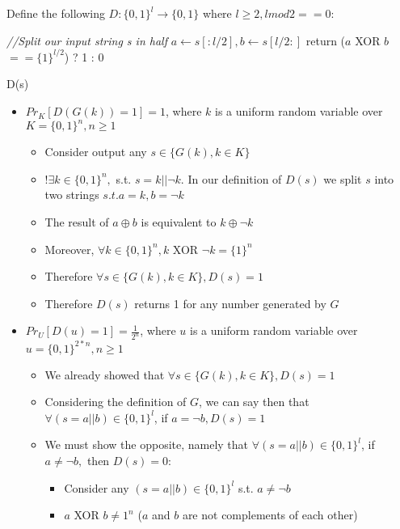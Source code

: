 \documentclass[]{article}
\begin{document}
\section{}
Define the following $D: \{0, 1\}^l \rightarrow \{0,1\}$ where $l \geq 2, l mod 2 == 0$:
\\
\begin{algorithm}[H]
\SetAlgoLined
	\emph{//Split our input string s in half}\;
	$a \leftarrow s[:l/2], b \leftarrow s[l/2:]$\;
	return ($a$ XOR $b$ $== \{1\}^{l/2}$) ? 1 : 0\;
	\caption{D(s)}
\end{algorithm}

\begin{itemize}
	\item $Pr_K[D(G(k)) = 1] = 1$, where $k$ is a uniform random variable over $K = \{0, 1\}^n, n \geq 1$
	\begin{itemize}
		\item Consider output any $s \in \{G(k), k \in K\}$
		\item $!\exists k \in \{0,1\}^n,$ s.t.  $s = k || \lnot k$. In our definition of $D(s)$ we split $s$ into two strings $s.t. a = k, b = \lnot k$
		\item The result of $a \oplus b$ is equivalent to $k \oplus \lnot k$
		\item Moreover, $\forall k \in \{0,1\}^n, k$ XOR $\lnot k = \{1\}^n$
		\item Therefore $\forall s \in \{G(k), k \in K\}, D(s) = 1$
		\item Therefore $D(s)$ returns 1 for any number generated by $G$
	\end{itemize}
	\item $Pr_U[D(u) = 1] = \frac{1}{2^n}$, where $u$ is a uniform random variable over $u = \{0, 1\}^{2 *n}, n \geq 1$
	\begin{itemize}
		\item We already showed that $\forall s \in \{G(k), k \in K\}, D(s) = 1$
		\item Considering the definition of $G$, we can say then that $\forall (s = a || b) \in \{0,1\}^l$, if $a = \lnot b, D(s) = 1$
		\item We must show the opposite, namely that $\forall (s = a || b) \in \{0,1\}^l$, if $a \neq \lnot b,$ then $D(s) = 0$:
		\begin{itemize}
			\item Consider any $(s = a || b) \in \{0,1\}^l$ s.t. $a \neq \lnot b$
			\item $a$ XOR $b \neq {1}^n$ ($a$ and $b$ are not complements of each other)

\end{itemize}
\end{itemize}
\end{itemize}
\end{document}
